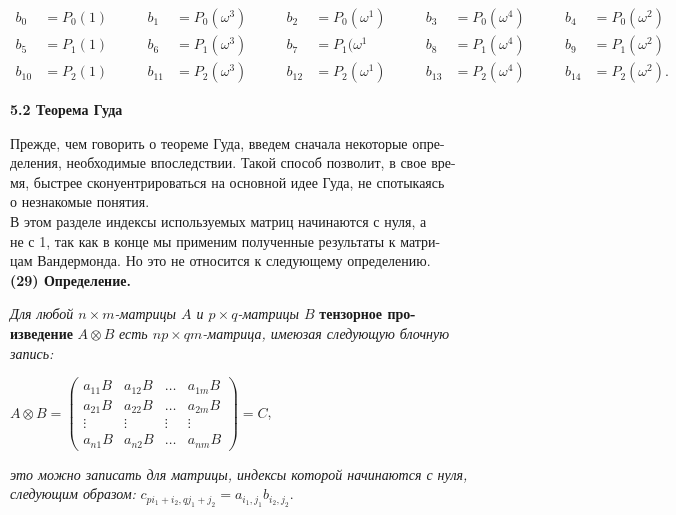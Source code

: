 \documentclass{mai_book}
\begin{document}
{\begin{align*}
b_0&=P_0(1)  &\qquad b_1&=P_0(\omega^3) &\qquad b_2&=P_0(\omega^1) &\qquad b_3&=P_0(\omega^4) &\qquad b_4&=P_0(\omega^2)\\
b_5&=P_1(1) &\qquad b_6&=P_1(\omega^3) &\qquad b_7&=P_1(\omega^1 &\qquad b_8&=P_1(\omega^4) &\qquad b_9&=P_1(\omega^2) \\
{b_{10}}&=P_2(1) &\qquad {b_{11}}&=P_2(\omega^3) &\qquad {b_{12}}&=P_2(\omega^1) &\qquad {b_{13}}&=P_2(\omega^4) &\qquad {b_{14}}&=P_2(\omega^2).
\end{align*} 
\newpage
{}
\begin{large}
\noindent \textbf{ 5.2 Теорема Гуда}	
\end{large}

\medskip
\noindent Прежде, чем говорить о теореме Гуда, введем сначала некоторые опре-\\деления, необходимые впоследствии. Такой способ позволит, в свое вре-\\мя, быстрее сконуентрироваться на основной идее Гуда, не спотыкаясь \\ о незнакомые понятия.\\
\indent В этом разделе индексы используемых матриц начинаются с нуля, а \\ не с 1, так как в конце мы применим полученные результаты к матри-\\ цам Вандермонда. Но это не относится к следующему определению. \\

\noindent\textbf{(29) Определение.} 

\medskip
\indent \textit{ Для любой $n\times m$-матрицы $A$ и $p{\times}q$-матрицы $B$} \textbf{тензорное про-\\изведение} $A\otimes B$ \textit{есть $np\times qm$-матрица, имеюзая следующую блочную\\ запись:} \\
\begin{center}
	$A\otimes B = 
	\begin{pmatrix}
	a_{11}B &  a_{12}B & \ldots & a_{1m}B\\
	a_{21}B &  a_{22}B & \ldots &   a_{2m}B\\
	\vdots & \vdots & \vdots & \vdots \\ 
	a_{n1}B &  a_{n2}B & \ldots &  a_{nm}B
	\end{pmatrix}
	 = C$,
\end{center}
\noindent\textit{ это можно записать для матрицы, индексы которой начинаются с нуля, \\ следующим образом:} $c_{pi_1+i_2, qj_1 + j_2} = a_{i_1, j_1}b_{i_2, j_2}$. \\ 

}
\end{document}
